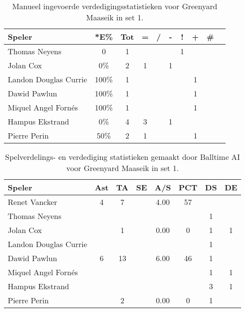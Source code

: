 \begin{table}[ht!]
    \centering
    \scriptsize
    \begin{tabular}{|l|c|c|c|c|c|c|c|c|c|} \hline
        \textbf{Speler}  & *E\% & Tot & = & / & - & ! & + & \# \\ \hline
        Thomas Neyens & 0 & 1 & & & & 1 & & \\
        Jolan Cox & 0\% & 2 & 1 &  & 1 &  &  &  \\ 
        Landon Douglas Currie & 100\% & 1 &  &  &  &  & 1 &  \\ 
        Dawid Pawlun & 100\% & 1 &  &  &  &  & 1 &  \\ 
        Miquel Angel Fornés & 100\% & 1 &  &  &  &  & 1 &  \\ 
        Hampus Ekstrand & 0\% & 4 & 3 &  & 1 &  &  &  \\ 
        Pierre Perin & 50\% & 2 & 1 &  &  &  & 1 &  \\ \hline
    \end{tabular}
    \caption[Manueel ingevoerde verdedigingsstatistieken voor Greenyard Maaseik in set 1]{\label{tab:PL1DigMaaseikMan1}Manueel ingevoerde verdedigingsstatistieken voor Greenyard Maaseik in set 1.}
\end{table}

\begin{table}[ht!]
  \centering
  \scriptsize
  \begin{tabular}{|l|c|c|c|c|c|c|c|}  \hline
    \textbf{Speler} & Ast & TA & SE & A/S & PCT & DS & DE \\ \hline
    Renet Vancker & 4 & 7 &  & 4.00 & 57 &  &  \\
    Thomas Neyens &  &  &  &  &  & 1 &  \\
    Jolan Cox &  & 1 &  & 0.00 & 0 & 1 & 1 \\
    Landon Douglas Currie &  &  &  &  &  & 1 &  \\
    Dawid Pawlun & 6 & 13 &  & 6.00 & 46 & 1 &  \\
    Miquel Angel Fornés &  &  &  &  &  & 1 & 1 \\
    Hampus Ekstrand &  &  &  &  &  & 3 & 1 \\
    Pierre Perin &  & 2 &  & 0.00 & 0 & 1 &  \\ \hline
  \end{tabular}
  \caption[Spelverdelings- en verdedigingsstatistieken gemaakt door Balltime AI voor Greenyard Maaseik in set 1]{\label{tab:PL1SetDigMaaseikAI1}Spelverdelings- en verdediging statistieken gemaakt door Balltime AI voor Greenyard Maaseik in set 1.}
\end{table}

